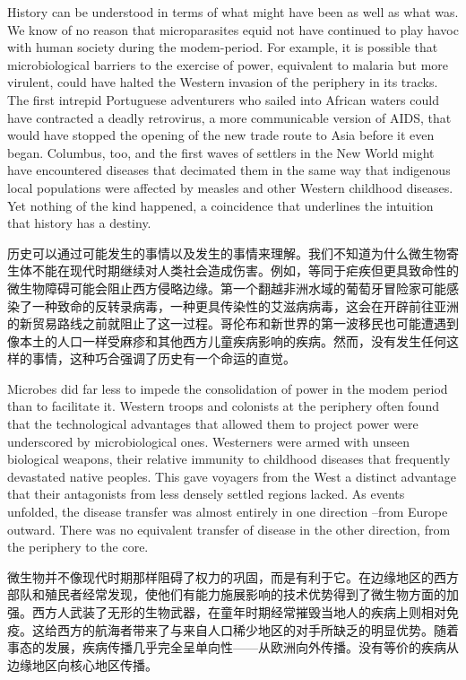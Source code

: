 \begin{paracol}{2}

History can be understood in terms of what might have been as well as what was. We know of no reason that microparasites equid not have continued to play havoc with human society during the modem-period. For example, it is possible that microbiological barriers to the exercise of power, equivalent to malaria but more virulent, could have halted the Western invasion of the periphery in its tracks. The first intrepid Portuguese adventurers who sailed into African waters could have contracted a deadly retrovirus, a more communicable version of AIDS, that would have stopped the opening of the new trade route to Asia before it even began. Columbus, too, and the first waves of settlers in the New World might have encountered diseases that decimated them in the same way that indigenous local populations were affected by measles and other Western childhood diseases. Yet nothing of the kind happened, a coincidence that underlines the intuition that history has a destiny.

\switchcolumn
历史可以通过可能发生的事情以及发生的事情来理解。我们不知道为什么微生物寄生体不能在现代时期继续对人类社会造成伤害。例如，等同于疟疾但更具致命性的微生物障碍可能会阻止西方侵略边缘。第一个翻越非洲水域的葡萄牙冒险家可能感染了一种致命的反转录病毒，一种更具传染性的艾滋病病毒，这会在开辟前往亚洲的新贸易路线之前就阻止了这一过程。哥伦布和新世界的第一波移民也可能遭遇到像本土的人口一样受麻疹和其他西方儿童疾病影响的疾病。然而，没有发生任何这样的事情，这种巧合强调了历史有一个命运的直觉。

\switchcolumn*
Microbes did far less to impede the consolidation of power in the modem period than to facilitate it. Western troops and colonists at the periphery often found that the technological advantages that allowed them to project power were underscored by microbiological ones. Westerners were armed with unseen biological weapons, their relative immunity to childhood diseases that frequently devastated native peoples. This gave voyagers from the West a distinct advantage that their antagonists from less densely settled regions lacked. As events unfolded, the disease transfer was almost entirely in one direction --from Europe outward. There was no equivalent transfer of disease in the other direction, from the periphery to the core. 

\switchcolumn
微生物并不像现代时期那样阻碍了权力的巩固，而是有利于它。在边缘地区的西方部队和殖民者经常发现，使他们有能力施展影响的技术优势得到了微生物方面的加强。西方人武装了无形的生物武器，在童年时期经常摧毁当地人的疾病上则相对免疫。这给西方的航海者带来了与来自人口稀少地区的对手所缺乏的明显优势。随着事态的发展，疾病传播几乎完全呈单向性——从欧洲向外传播。没有等价的疾病从边缘地区向核心地区传播。


\end{paracol}

